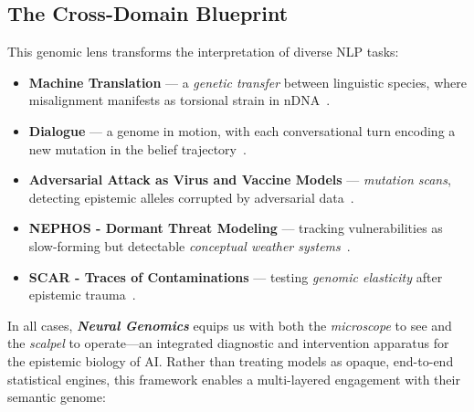 \subsection*{\textbf{The Cross-Domain Blueprint}}
This genomic lens transforms the interpretation of diverse NLP tasks:
\begin{itemize}
    \item \textbf{Machine Translation} — a \emph{genetic transfer} between linguistic species, where misalignment manifests as torsional strain in nDNA~\cite{koehn2020neural, marie2022scientific}.
    \item \textbf{Dialogue} — a genome in motion, with each conversational turn encoding a new mutation in the belief trajectory~\cite{mehri2020usr, huang2020grade, liu2023geval}.
    \item \textbf{Adversarial Attack as Virus and  Vaccine Models} — \emph{mutation scans}, detecting epistemic alleles corrupted by adversarial data~\cite{zellers2019defending, schuster2020limitations}.
    \item \textbf{NEPHOS - Dormant Threat Modeling} — tracking vulnerabilities as slow-forming but detectable \emph{conceptual weather systems}~\cite{das2024nephos}.
    \item \textbf{SCAR - Traces of Contaminations} — testing \emph{genomic elasticity} after epistemic trauma~\cite{das2024scar}.
\end{itemize}

In all cases, \textbf{\emph{Neural Genomics}} equips us with both the \emph{microscope} to see and the \emph{scalpel} to operate—an integrated diagnostic and intervention apparatus for the epistemic biology of AI. Rather than treating models as opaque, end-to-end statistical engines, this framework enables a multi-layered engagement with their semantic genome:

